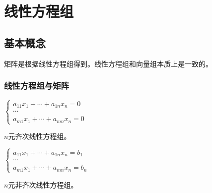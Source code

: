 \setcounter{tocdepth}{4}
\setcounter{secnumdepth}{4}
\renewcommand{\baselinestretch}{1.5}
\usepackage{multicol}
\usepackage{arydshln}
\setlength{\dashlinegap}{2pt}
\setlength{\dashlinedash}{2pt}
\chapter{线性方程组}
\section{基本概念}

矩阵是根据线性方程组得到。线性方程组和向量组本质上是一致的。

\subsection{线性方程组与矩阵}

\begin{multicols}{2}
    
    $\begin{cases}
        a_{11}x_1+\cdots+a_{1n}x_n=0 \\
        \cdots \\
        a_{m1}x_1+\cdots+a_{mn}x_n=0
    \end{cases}$ \medskip
    
    $n$元齐次线性方程组。

    $\begin{cases}
        a_{11}x_1+\cdots+a_{1n}x_n=b_1 \\
        \cdots \\
        a_{m1}x_1+\cdots+a_{mn}x_n=b_n
    \end{cases}$ \medskip
    
    $n$元非齐次线性方程组。

\end{multicols}

